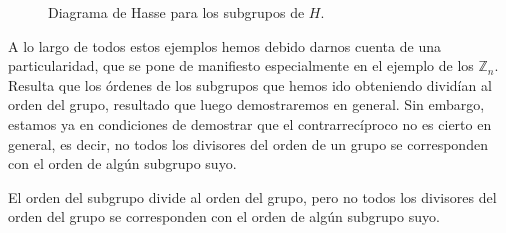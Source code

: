 \begin{ejemplo}
\begin{figure}[H]
    \centering
    \caption{Diagrama de Hasse para los subgrupos de $H$.}
\end{figure}
\end{ejemplo}

A lo largo de todos estos ejemplos hemos debido darnos cuenta de una particularidad, que se pone de manifiesto especialmente en el ejemplo de los $\mathbb{Z}_n$. Resulta que los órdenes de los subgrupos que hemos ido obteniendo dividían al orden del grupo, resultado que luego demostraremos en general. Sin embargo, estamos ya en condiciones de demostrar que el contrarrecíproco no es cierto en general, es decir, no todos los divisores del orden de un grupo se corresponden con el orden de algún subgrupo suyo.

\begin{prop} 
    El orden del subgrupo divide al orden del grupo, pero no todos los divisores del orden del grupo se corresponden con el orden de algún subgrupo suyo.
\end{prop}


